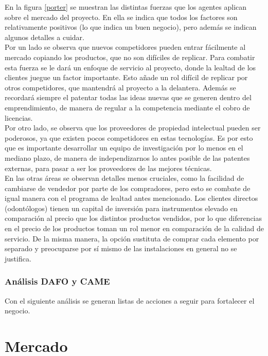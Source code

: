 \documentclass[letterpaper,12pt]{article}
\begin{document}
En la figura \ref{porter} se muestran las distintas fuerzas que los agentes aplican sobre el
mercado del proyecto. En ella se indica que todos los factores son relativamente positivos (lo que 
indica un buen negocio), pero además se indican algunos detalles a cuidar.
\\[0.5cm]
\indent Por un lado se observa que nuevos competidores pueden entrar fácilmente al mercado 
copiando los productos, que no son difíciles de replicar. Para combatir esta fuerza se le dará un 
enfoque de servicio al proyecto, donde la lealtad de los clientes juegue un factor importante. Esto 
añade un rol difícil de replicar por otros competidores, que mantendrá al proyecto a la delantera. 
Además se recordará siempre el patentar todas las ideas nuevas que se generen dentro del 
emprendimiento, de manera de regular a la competencia mediante el cobro de licencias.
\\[0.5cm]
\indent Por otro lado, se observa que los proveedores de propiedad intelectual pueden ser 
poderosos, ya que existen pocos competidores en estas tecnologías. Es por esto que es importante 
desarrollar un equipo de investigación por lo menos en el mediano plazo, de manera de 
independizarnos lo antes posible de las patentes externas, para pasar a ser los proveedores de las 
mejores técnicas.
\\[0.5cm]
\indent En las otras áreas se observan detalles menos cruciales, como la facilidad de cambiarse de 
vendedor por parte de los compradores, pero esto se combate de igual manera con el programa de 
lealtad antes mencionado. Los clientes directos (odontólogos) tienen un capital de inversión para 
instrumentos elevado en comparación al precio que los distintos productos vendidos, por lo que 
diferencias en el precio de los productos toman un rol menor en comparación de la calidad de 
servicio. De la misma manera, la opción sustituta de comprar cada elemento por separado y 
preocuparse por sí mismo de las instalaciones en general no se justifica.
		\newpage
		\subsubsection{Análisis DAFO y CAME}
Con el siguiente análisis se generan listas de acciones a seguir para fortalecer el negocio.
\newpage
\section{Mercado}
\end{document}
